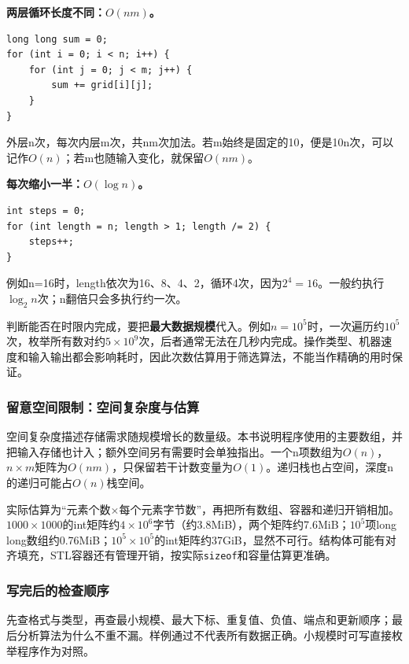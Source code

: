 \textbf{两层循环长度不同：$O(nm)$。}
\begin{lstlisting}
long long sum = 0;
for (int i = 0; i < n; i++) {
    for (int j = 0; j < m; j++) {
        sum += grid[i][j];
    }
}
\end{lstlisting}
外层n次，每次内层m次，共nm次加法。若m始终是固定的10，便是10n次，可以记作$O(n)$；若m也随输入变化，就保留$O(nm)$。

\textbf{每次缩小一半：$O(\log n)$。}
\begin{lstlisting}
int steps = 0;
for (int length = n; length > 1; length /= 2) {
    steps++;
}
\end{lstlisting}
例如n=16时，length依次为16、8、4、2，循环4次，因为$2^4=16$。一般约执行$\log_2 n$次；n翻倍只会多执行约一次。

判断能否在时限内完成，要把\textbf{最大数据规模}代入。例如$n=10^5$时，一次遍历约$10^5$次，枚举所有数对约$5\times10^9$次，后者通常无法在几秒内完成。操作类型、机器速度和输入输出都会影响耗时，因此次数估算用于筛选算法，不能当作精确的用时保证。
\subsubsection{留意空间限制：空间复杂度与估算}
空间复杂度描述存储需求随规模增长的数量级。本书说明程序使用的主要数组，并把输入存储也计入；额外空间另有需要时会单独指出。一个n项数组为$O(n)$，$n\times m$矩阵为$O(nm)$，只保留若干计数变量为$O(1)$。递归栈也占空间，深度n的递归可能占$O(n)$栈空间。

实际估算为“元素个数$\times$每个元素字节数”，再把所有数组、容器和递归开销相加。$1000\times1000$的int矩阵约$4\times10^6$字节（约3.8MiB），两个矩阵约7.6MiB；$10^5$项long long数组约0.76MiB；$10^5\times10^5$的int矩阵约37GiB，显然不可行。结构体可能有对齐填充，STL容器还有管理开销，按实际\texttt{sizeof}和容量估算更准确。
\subsubsection{写完后的检查顺序}
先查格式与类型，再查最小规模、最大下标、重复值、负值、端点和更新顺序；最后分析算法为什么不重不漏。样例通过不代表所有数据正确。小规模时可写直接枚举程序作为对照。
